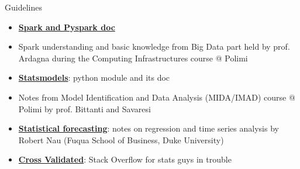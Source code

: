 \documentclass[british]{beamer}
\begin{document}
\begin{frame}{Guidelines}
	\begin{itemize}
		\item \href{https://spark.apache.org/docs/2.1.0/api/python/}{\textbf{Spark and Pyspark doc}}
		\item Spark understanding and basic knowledge from Big Data part held by prof. Ardagna during the Computing Infrastructures course @ Polimi
		\item \href{http://www.statsmodels.org/stable/index.html}{\textbf{Statsmodels}}: python module and its doc 
		\item Notes from Model Identification and Data Analysis (MIDA/IMAD) course @ Polimi by prof. Bittanti and Savaresi
		\item \href{http://people.duke.edu/~rnau/411home.htm}{\textbf{Statistical forecasting}}: notes on regression and time series analysis by Robert Nau (Fuqua School of Business, Duke University) 
		\item \href{https://stats.stackexchange.com/}{\textbf{Cross Validated}}: Stack Overflow for stats guys in trouble
	\end{itemize}
\end{frame}
\end{document}
